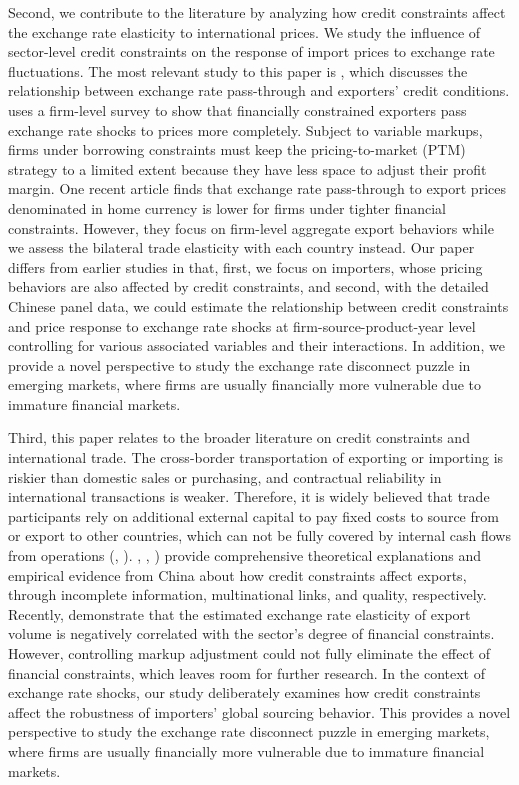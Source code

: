 \documentclass[12pt]{article}
\begin{document}
Second, we contribute to the literature by analyzing how credit constraints affect the exchange rate elasticity to international prices. We study the influence of sector-level credit constraints on the response of import prices to exchange rate fluctuations. The most relevant study to this paper is \cite{strasser2013}, which discusses the relationship between exchange rate pass-through and exporters' credit conditions. \cite{strasser2013} uses a firm-level survey to show that financially constrained exporters pass exchange rate shocks to prices more completely. Subject to variable markups, firms under borrowing constraints must keep the pricing-to-market (PTM) strategy to a limited extent because they have less space to adjust their profit margin. One recent article \cite{dai2021} finds that exchange rate pass-through to export prices denominated in home currency is lower for firms under tighter financial constraints. However, they focus on firm-level aggregate export behaviors while we assess the bilateral trade elasticity with each country instead. Our paper differs from earlier studies in that, first, we focus on importers, whose pricing behaviors are also affected by credit constraints, and second, with the detailed Chinese panel data, we could estimate the relationship between credit constraints and price response to exchange rate shocks at firm-source-product-year level controlling for various associated variables and their interactions. In addition, we provide a novel perspective to study the exchange rate disconnect puzzle in emerging markets, where firms are usually financially more vulnerable due to immature financial markets.

Third, this paper relates to the broader literature on credit constraints and international trade. The cross-border transportation of exporting or importing is riskier than domestic sales or purchasing, and contractual reliability in international transactions is weaker. Therefore, it is widely believed that trade participants rely on additional external capital to pay fixed costs to source from or export to other countries, which can not be fully covered by internal cash flows from operations (\cite{manova2013}, \cite{chaney2016}). \cite{feenstra-li-yu2014}, \cite{manova-wei-zhang2015}, \cite{fan-lai-li2015}) provide comprehensive theoretical explanations and empirical evidence from China about how credit constraints affect exports, through incomplete information, multinational links, and quality, respectively. Recently, \cite{xu-guo2021} demonstrate that the estimated exchange rate elasticity of export volume is negatively correlated with the sector’s degree of financial constraints. However, controlling markup adjustment could not fully eliminate the effect of financial constraints, which leaves room for further research. In the context of exchange rate shocks, our study deliberately examines how credit constraints affect the robustness of importers' global sourcing behavior. This provides a novel perspective to study the exchange rate disconnect puzzle in emerging markets, where firms are usually financially more vulnerable due to immature financial markets.
\end{document}
